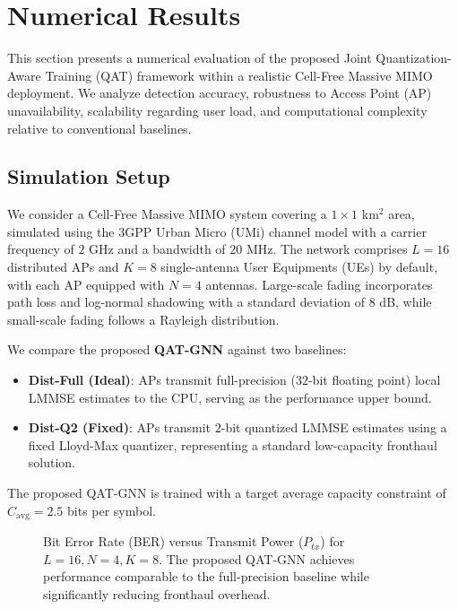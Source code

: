 \section{Numerical Results}

This section presents a numerical evaluation of the proposed Joint Quantization-Aware Training (QAT) framework within a realistic Cell-Free Massive MIMO deployment. We analyze detection accuracy, robustness to Access Point (AP) unavailability, scalability regarding user load, and computational complexity relative to conventional baselines.

\subsection{Simulation Setup}
We consider a Cell-Free Massive MIMO system covering a $1 \times 1$ km$^2$ area, simulated using the 3GPP Urban Micro (UMi) channel model with a carrier frequency of $2$ GHz and a bandwidth of $20$ MHz. The network comprises $L=16$ distributed APs and $K=8$ single-antenna User Equipments (UEs) by default, with each AP equipped with $N=4$ antennas. Large-scale fading incorporates path loss and log-normal shadowing with a standard deviation of $8$ dB, while small-scale fading follows a Rayleigh distribution.

We compare the proposed \textbf{QAT-GNN} against two baselines:
\begin{itemize}
    \item \textbf{Dist-Full (Ideal)}: APs transmit full-precision ($32$-bit floating point) local LMMSE estimates to the CPU, serving as the performance upper bound.
    \item \textbf{Dist-Q2 (Fixed)}: APs transmit $2$-bit quantized LMMSE estimates using a fixed Lloyd-Max quantizer, representing a standard low-capacity fronthaul solution.
\end{itemize}
The proposed QAT-GNN is trained with a target average capacity constraint of $C_{\text{avg}} = 2.5$ bits per symbol.

\begin{figure}[t!]
    \centering
    
    \caption{Bit Error Rate (BER) versus Transmit Power ($P_{tx}$) for $L=16, N=4, K=8$. The proposed QAT-GNN achieves performance comparable to the full-precision baseline while significantly reducing fronthaul overhead.}
    \label{fig:ber_snr}
\end{figure}

